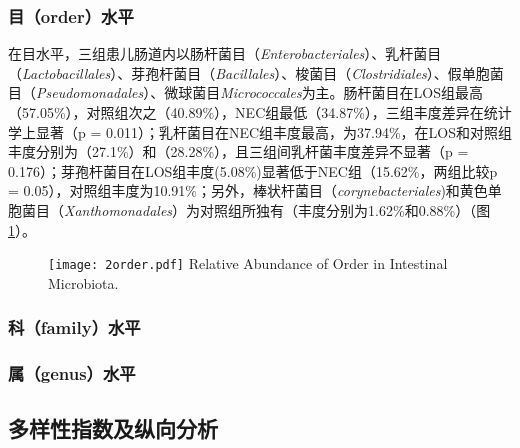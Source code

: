 {{    \subsubsection{目（order）水平}
    在目水平，三组患儿肠道内以肠杆菌目（\textit{Enterobacteriales}）、乳杆菌目（\textit{Lactobacillales}）、芽孢杆菌目（\textit{Bacillales}）、梭菌目（\textit{Clostridiales}）、假单胞菌目（\textit{Pseudomonadales}）、微球菌目\textit{Micrococcales}为主。肠杆菌目在LOS组最高（57.05\%），对照组次之（40.89\%），NEC组最低（34.87\%），三组丰度差异在统计学上显著（p = 0.011）；乳杆菌目在NEC组丰度最高，为37.94\%，在LOS和对照组丰度分别为（27.1\%）和（28.28\%），且三组间乳杆菌丰度差异不显著（p = 0.176）；芽孢杆菌目在LOS组丰度(5.08\%)显著低于NEC组（15.62\%，两组比较p = 0.05），对照组丰度为10.91\%；另外，棒状杆菌目（\textit{corynebacteriales})和黄色单胞菌目（\textit{Xanthomonadales}）为对照组所独有（丰度分别为1.62\%和0.88\%）（图\ref{fig:2order}）。
      \begin{figure}[!htp]
        \centering
        \texttt{[image: 2order.pdf]}
          {Relative Abundance of Order in Intestinal Microbiota.}
        \label{fig:2order}
      \end{figure}

    \subsubsection{科（family）水平}
    \subsubsection{属（genus）水平}

  \subsection{多样性指数及纵向分析}
}}
